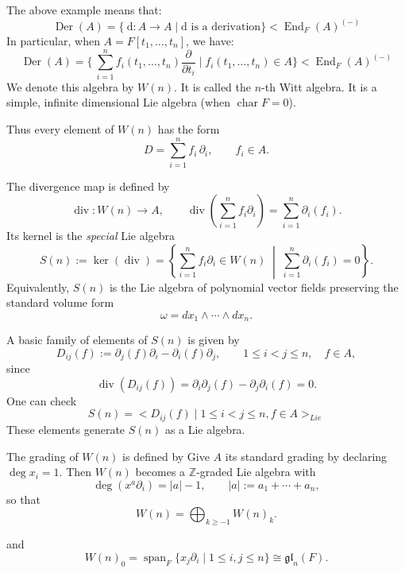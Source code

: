The above example means that:
\[
    \operatorname{Der}(A)=\{\ \mathrm{d}: A \to A \mid \mathrm{d} \text{ is a derivation} \} < \operatorname{End}_F(A)^{(-)}
\]
In particular, when $A=F[t_1,\ldots ,t_n]$, we have:
\[
    \operatorname{Der}(A)=\{\ \sum_{i=1}^n f_i(t_1,\ldots ,t_n) \frac{\partial}{\partial t_i} \mid f_i(t_1,\ldots ,t_n) \in A \} < \operatorname{End}_F(A)^{(-)}
\]
We denote this algebra by $W(n)$. It is called the $n$-th Witt algebra. It is a simple, infinite dimensional Lie algebra (when $\operatorname{char}F=0$).

Thus every element of $W(n)$ has the form
\[
    D=\sum_{i=1}^n f_i\,\partial_i,
    \qquad f_i\in A.
\]

\begin{definition}
    The divergence map is defined by
    \[
        \operatorname{div}:W(n)\to A,
        \qquad
        \operatorname{div}\!\left(\sum_{i=1}^n f_i\partial_i\right)
        =\sum_{i=1}^n \partial_i(f_i).
    \]
    Its kernel is the \emph{special} Lie algebra
    \[
        S(n):=\ker(\operatorname{div})
        =\left\{
        \sum_{i=1}^n f_i\partial_i\in W(n)
        \;\middle|\;
        \sum_{i=1}^n \partial_i(f_i)=0
        \right\}.
    \]
    Equivalently, $S(n)$ is the Lie algebra of polynomial vector fields preserving
    the standard volume form
    \[
        \omega=dx_1\wedge\cdots\wedge dx_n.
    \]
\end{definition}


A basic family of elements of $S(n)$ is given by
\[
    D_{ij}(f):=\partial_j(f)\partial_i-\partial_i(f)\partial_j,
    \qquad
    1\le i<j\le n,\quad f\in A,
\]
since
\[
    \operatorname{div}(D_{ij}(f))
    =
    \partial_i\partial_j(f)-\partial_j\partial_i(f)=0.
\]
One can check
\[
    S(n)=< D_{ij}(f) \mid 1\le i<j\le n, f\in A >_{Lie}
\]
These elements generate $S(n)$ as a Lie algebra.

\begin{definition}
    The grading of $W(n)$ is defined by
    Give $A$ its standard grading by declaring $\deg x_i=1$. Then $W(n)$ becomes a
    $\mathbb Z$-graded Lie algebra with
    \[
        \deg(x^a\partial_i)=|a|-1,
        \qquad
        |a|:=a_1+\cdots+a_n,
    \]
    so that
    \[
        W(n)=\bigoplus_{k\ge -1} W(n)_k.
    \]

    and
    \[
        W(n)_0
        =
        \operatorname{span}_F\{x_j\partial_i\mid 1\le i,j\le n\}
        \cong \mathfrak{gl}_n(F).
    \]
\end{definition}


